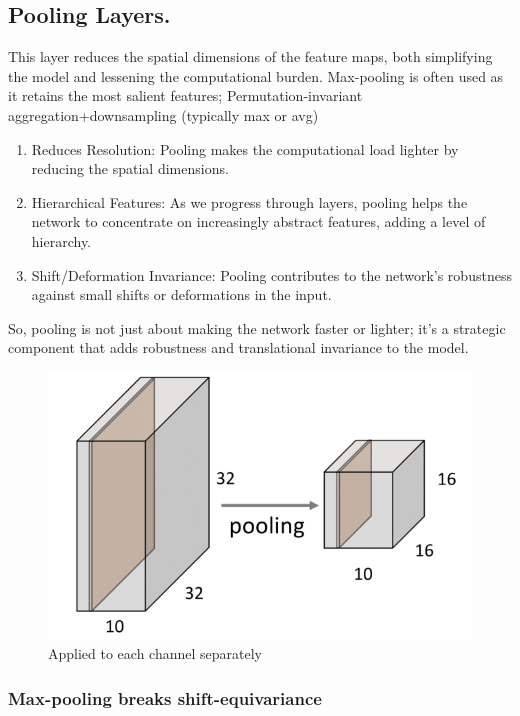 \documentclass[11pt]{article}
\begin{document}

\subsection{Pooling Layers.}

This layer reduces the spatial dimensions of the feature maps, both simplifying the model and lessening the computational burden.  Max-pooling is often used as it retains the most salient features; Permutation-invariant aggregation+downsampling (typically max or avg)

\begin{enumerate}
    \item Reduces Resolution: Pooling makes the computational load lighter by reducing the     spatial dimensions.
    \item Hierarchical Features: As we progress through layers, pooling helps the network to     concentrate on increasingly abstract features, adding a level of hierarchy.
    \item Shift/Deformation Invariance: Pooling contributes to the network's robustness against    small shifts or deformations in the input.
\end{enumerate}

So, pooling is not just about making the network faster or lighter; it's a strategic component that adds robustness and translational invariance to the model.

\begin{figure}[H]
    \centering
    \includegraphics[width=.6\linewidth]{figures/pooling.png}
    \caption{Applied to each channel separately}
\end{figure}

\subsubsection{Max-pooling breaks shift-equivariance~\cite{youtubeMakingConvolutional}}
\end{document}
